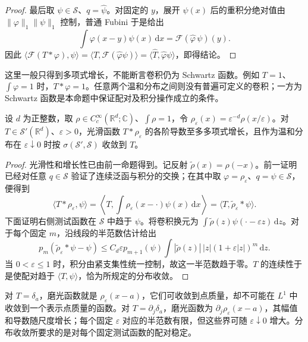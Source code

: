 \begin{proof}
最后取 \(\psi\in\mathcal S\)、\(q=\widehat\psi\)。对固定的 \(y\)，展开 \(\widehat\psi(x)\) 后的重积分绝对值由 \(\|\varphi\|_1\|\psi\|_1\) 控制，普通 Fubini 于是给出
\[
 \int\varphi(x-y)\widehat\psi(x)\,\mathrm{d}x
 =\mathcal F(\widehat\varphi\,\psi)(y).
\]
因此 \(\langle\mathcal F(T*\varphi),\psi\rangle=\langle T,\mathcal F(\widehat\varphi\psi)\rangle=\langle\widehat T,\widehat\varphi\psi\rangle\)，即得结论。
\end{proof}

这里一般只得到多项式增长，不能断言卷积仍为 Schwartz 函数。例如 \(T=1\)、\(\int\varphi=1\) 时，\(T*\varphi=1\)。任意两个温和分布之间则没有普遍可定义的卷积；一方为 Schwartz 函数是本命题中保证配对及积分操作成立的条件。

\begin{proposition}[温和分布的磨光]\label{b2:prop:05-tempered-regularization}
设 \(d\) 为正整数，取 \(\rho\in C_c^\infty(\mathbb R^d;\mathbb C)\)、\(\int\rho=1\)，令 \(\rho_\varepsilon(x)=\varepsilon^{-d}\rho(x/\varepsilon)\)。对 \(T\in\mathcal S'(\mathbb R^d)\)、\(\varepsilon>0\)，光滑函数 \(T*\rho_\varepsilon\) 的各阶导数至多多项式增长，且作为温和分布在 \(\varepsilon\downarrow0\) 时按 \(\sigma(\mathcal S',\mathcal S)\) 收敛到 \(T\)。
\end{proposition}
\begin{proof}
光滑性和增长性已由前一命题得到。记反射 \(\widetilde\rho(x)=\rho(-x)\)。前一证明已经对任意 \(q\in\mathcal S\) 验证了连续泛函与积分的交换；在其中取 \(\varphi=\rho_\varepsilon\)、\(q=\psi\in\mathcal S\)，便得到
\[
 \langle T*\rho_\varepsilon,\psi\rangle
 =\left\langle T,\int\rho_\varepsilon(x-\cdot)\psi(x)\,\mathrm{d}x\right\rangle
 =\langle T,\widetilde\rho_\varepsilon*\psi\rangle.
\]
下面证明右侧测试函数在 \(\mathcal S\) 中趋于 \(\psi\)。将卷积换元为 \(\int\widetilde\rho(z)\psi(\cdot-\varepsilon z)\,\mathrm{d}z\)。对于每个固定 \(m\)，沿线段的半范数估计给出
\[
 p_m(\widetilde\rho_\varepsilon*\psi-\psi)
 \leq C_d\varepsilon p_{m+1}(\psi)
       \int|\widetilde\rho(z)|\,|z|(1+\varepsilon|z|)^m\,\mathrm{d}z.
\]
当 \(0<\varepsilon\leq1\) 时，积分由紧支集性统一控制，故这一半范数趋于零。\(T\) 的连续性于是使配对趋于 \(\langle T,\psi\rangle\)，恰为所规定的分布收敛。
\end{proof}

对 \(T=\delta_a\)，磨光函数就是 \(\rho_\varepsilon(x-a)\)，它们可收敛到点质量，却不可能在 \(L^1\) 中收敛到一个表示点质量的函数。对 \(T=\partial_j\delta_a\)，磨光函数为 \(\partial_j\rho_\varepsilon(x-a)\)，其幅值和导数随尺度增长；每个固定 \(\varepsilon\) 对应的半范数有限，但这些界可随 \(\varepsilon\downarrow0\) 增大。分布收敛所要求的是对每个固定测试函数的配对稳定。
